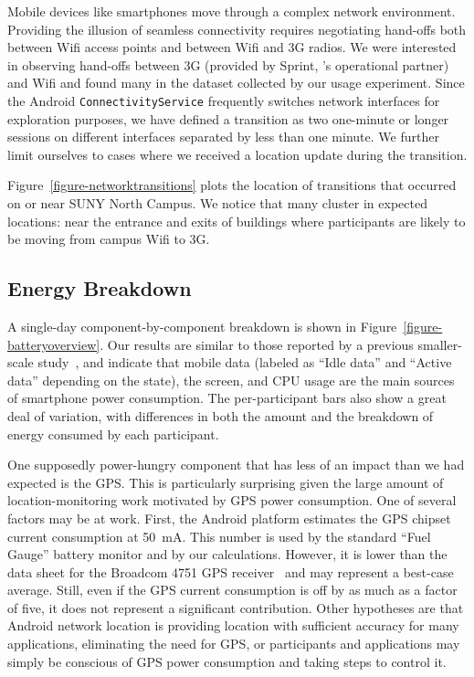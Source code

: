 Mobile devices like smartphones move through a complex network environment.
Providing the illusion of seamless connectivity requires negotiating hand-offs
both between Wifi access points and between Wifi and 3G radios. We were
interested in observing hand-offs between 3G (provided by Sprint, \PhoneLab{}'s
operational partner) and Wifi and found many in the dataset collected by our
usage experiment. Since the Android \texttt{ConnectivityService} frequently
switches network interfaces for exploration purposes, we have defined a
transition as two one-minute or longer sessions on different interfaces
separated by less than one minute. We further limit ourselves to cases where we
received a location update during the transition.

Figure~\ref{figure-networktransitions} plots the location of transitions that
occurred on or near SUNY North Campus. We notice that many cluster in
expected locations: near the entrance and exits of buildings where
participants are likely to be moving from campus Wifi to 3G.

\subsection{Energy Breakdown}

A single-day component-by-component breakdown is shown in
Figure~\ref{figure-batteryoverview}. Our results are similar to those reported
by a previous smaller-scale study~\cite{shye:micro:2009}, and indicate that
mobile data (labeled as ``Idle data'' and ``Active data'' depending on the
state), the screen, and CPU usage are the main sources of smartphone power
consumption. The per-participant bars also show a great deal of variation, with
differences in both the amount and the breakdown of energy consumed by each
participant.

One supposedly power-hungry component that has less of an impact than we had
expected is the GPS. This is particularly surprising given the large amount
of location-monitoring work motivated by GPS power consumption. One of
several factors may be at work. First, the Android platform estimates the GPS
chipset current consumption at 50~mA. This number is used by the standard
``Fuel Gauge'' battery monitor and by our calculations. However, it is lower
than the data sheet for the Broadcom 4751 GPS receiver~\cite{bcm4751} and may
represent a best-case average. Still, even if the GPS current consumption is
off by as much as a factor of five, it does not represent a significant
contribution. Other hypotheses are that Android network location is providing
location with sufficient accuracy for many applications, eliminating the need
for GPS, or participants and applications may simply be conscious of GPS
power consumption and taking steps to control it.

